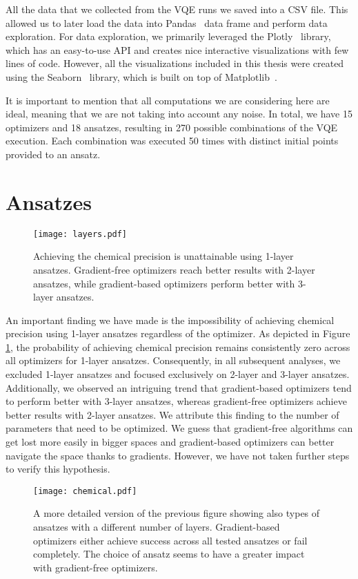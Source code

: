 All the data that we collected from the VQE runs we saved into a CSV file. This allowed us to later load the data into Pandas~\cite{pandas} data frame and perform data exploration. For data exploration, we primarily leveraged the Plotly~\cite{plotly} library, which has an easy-to-use API and creates nice interactive visualizations with few lines of code. However, all the visualizations included in this thesis were created using the Seaborn~\cite{seaborn} library, which is built on top of Matplotlib~\cite{seaborn}.

It is important to mention that all computations we are considering here are ideal, meaning that we are not taking into account any noise. In total, we have 15 optimizers and 18 ansatzes, resulting in 270 possible combinations of the VQE execution. Each combination was executed 50 times with distinct initial points provided to an ansatz.

\section{Ansatzes}
\begin{figure}[H]
    \centering
    \texttt{[image: layers.pdf]}
    \caption{Achieving the chemical precision is unattainable using 1-layer ansatzes. Gradient-free optimizers reach better results with 2-layer ansatzes, while gradient-based optimizers perform better with 3-layer ansatzes.}
    \label{fig:ansatz-layers}
\end{figure}
An important finding we have made is the impossibility of achieving chemical precision using 1-layer ansatzes regardless of the optimizer. As depicted in Figure \ref{fig:ansatz-layers}, the probability of achieving chemical precision remains consistently zero across all optimizers for 1-layer ansatzes. Consequently, in all subsequent analyses, we excluded 1-layer ansatzes and focused exclusively on 2-layer and 3-layer ansatzes. Additionally, we observed an intriguing trend that gradient-based optimizers tend to perform better with 3-layer ansatzes, whereas gradient-free optimizers achieve better results with 2-layer ansatzes. We attribute this finding to the number of parameters that need to be optimized. We guess that gradient-free algorithms can get lost more easily in bigger spaces and gradient-based optimizers can better navigate the space thanks to gradients. However, we have not taken further steps to verify this hypothesis. 

\begin{figure}[H]
    \centering
    \texttt{[image: chemical.pdf]}
    \caption{A more detailed version of the previous figure showing also types of ansatzes with a different number of layers. Gradient-based optimizers either achieve success across all tested ansatzes or fail completely. The choice of ansatz seems to have a greater impact with gradient-free optimizers.}
    \label{fig:chemical}
\end{figure}

